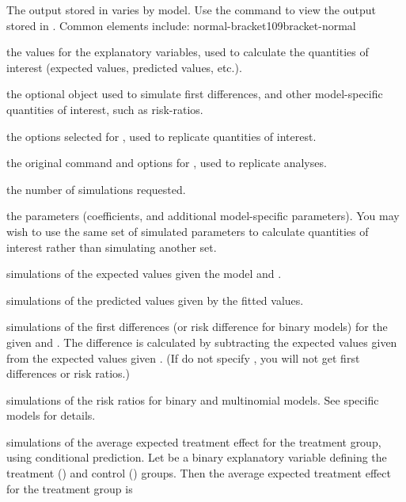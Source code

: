 \begin{Value}
The output stored in  varies by model.  Use the
 command to view the output stored in .
Common elements include:  normal-bracket109bracket-normal
\begin{ldescription}
\item[\code{x}] the  values for the explanatory variables,
used to calculate the quantities of interest (expected values,
predicted values, etc.). 
\item[\code{x1}] the optional  object used to simulate
first differences, and other model-specific quantities of
interest, such as risk-ratios.
\item[\code{call}] the options selected for , used to
replicate quantities of interest. 
\item[\code{zelig.call}] the original command and options for
, used to replicate analyses. 
\item[\code{num}] the number of simulations requested. 
\item[\code{par}] the parameters (coefficients, and additional
model-specific parameters).  You may wish to use the same set of
simulated parameters to calculate quantities of interest rather
than simulating another set.
\item[\code{qi\$ev}] simulations of the expected values given the
model and . 
\item[\code{qi\$pr}] simulations of the predicted values given by the
fitted values. 
\item[\code{qi\$fd}] simulations of the first differences (or risk
difference for binary models) for the given  and .
The difference is calculated by subtracting the expected values
given  from the expected values given .  (If do not
specify , you will not get first differences or risk
ratios.) 
\item[\code{qi\$rr}] simulations of the risk ratios for binary and
multinomial models.  See specific models for details.
\item[\code{qi\$ate.ev}] simulations of the average expected
treatment effect for the treatment group, using conditional
prediction. Let  be a binary explanatory variable defining
the treatment () and control () groups.  Then the
average expected treatment effect for the treatment group is

\end{ldescription}
\end{Value}
